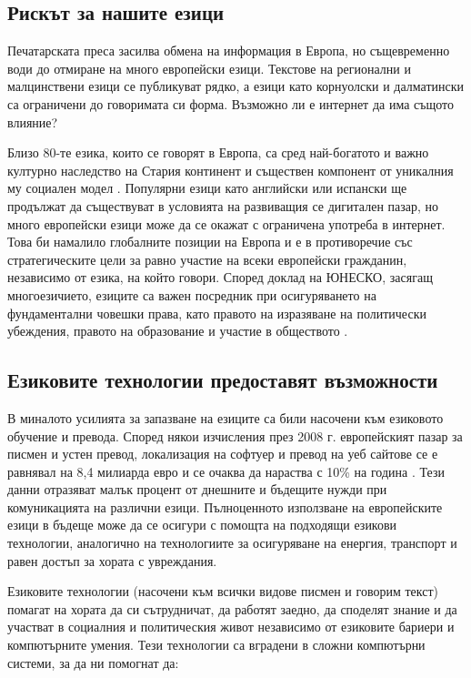 \documentclass[]{../../metanetpaper}
\begin{document}
\begin{multicols}{2}
\subsection{Рискът за нашите езици}

Печатарската преса засилва обмена на информация в Европа, но същевременно води до отмиране на много европейски езици. Текстове на регионални и малцинствени езици се публикуват рядко, а  езици като корнуолски и далматински са ограничени до говоримата си форма. Възможно ли е интернет да има същото влияние?

Близо  80-те езика, които се говорят в Европа, са сред
 най-богатото и важно културно наследство на Стария континент и съществен  компонент от уникалния му социален модел  \cite{EC2}. Популярни езици като английски или испански ще продължат да съществуват в условията на развиващия се дигитален пазар, но много европейски езици може да се окажат
с ограничена употреба в интернет. Това би намалило глобалните позиции на Европа и е в противоречие със стратегическите цели за равно участие на всеки европейски
 гражданин, независимо от езика, на който говори. Според доклад на ЮНЕСКО, засягащ многоезичието,  езиците са важен посредник при осигуряването на
фундаментални  човешки права, като правото
 на изразяване на политически убеждения, правото на образование и участие в обществото \cite{Unesco1}.


\subsection{Езиковите технологии предоставят възможности}

В миналото усилията за запазване на езиците са били насочени
 към езиковото обучение и превода. Според някои
 изчисления през 2008 г. европейският пазар за писмен и
 устен превод, локализация на софтуер и превод на
 уеб сайтове се е равнявал на 8,4 милиарда евро и се
 очаква да нараства с 10\% на година \cite{EC3}. Тези данни отразяват малък процент от днешните и бъдещите нужди при комуникацията на различни езици.
Пълноценното използване на европейските езици в бъдеще може да се осигури с помощта на подходящи езикови технологии, аналогично на технологиите за осигуряване  на енергия, транспорт и равен достъп за хората с увреждания.  

Езиковите технологии (насочени към всички видове писмен и говорим текст) помагат на хората да си сътрудничат, да работят заедно, да споделят знание и да участват в социалния и
 политическия живот независимо от езиковите бариери и компютърните умения. Тези технологии са вградени в сложни компютърни системи, за да ни помогнат да:
\columnbreak


\end{multicols}
\end{document}
